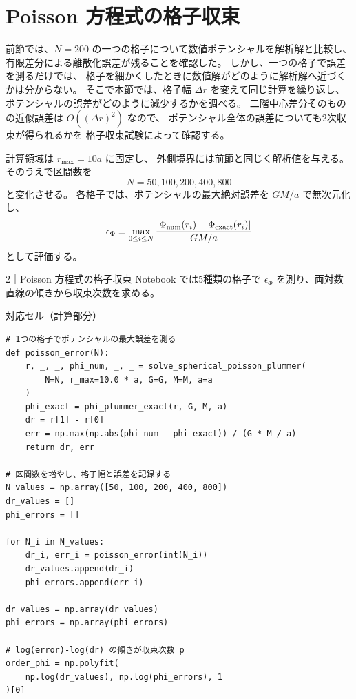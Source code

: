 \section{Poisson 方程式の格子収束}
\label{sec:ch2-poisson-convergence}

前節では、$N=200$ の一つの格子について数値ポテンシャルを解析解と比較し、
有限差分による離散化誤差が残ることを確認した。
しかし、一つの格子で誤差を測るだけでは、
格子を細かくしたときに数値解がどのように解析解へ近づくかは分からない。
そこで本節では、格子幅 $\Delta r$ を変えて同じ計算を繰り返し、
ポテンシャルの誤差がどのように減少するかを調べる。
二階中心差分そのものの近似誤差は $O((\Delta r)^2)$ なので、
ポテンシャル全体の誤差についても2次収束が得られるかを
格子収束試験によって確認する。

計算領域は $r_{\max}=10a$ に固定し、
外側境界には前節と同じく解析値を与える。
そのうえで区間数を
\begin{equation}
 N=50,100,200,400,800
\label{eq:ch2-poisson-grids}
\end{equation}
と変化させる。
各格子では、ポテンシャルの最大絶対誤差を $GM/a$ で無次元化し、
\begin{equation}
 \epsilon_\Phi
 \equiv
 \max_{0\le i\le N}
 \frac{|\Phi_{\rm num}(r_i)-\Phi_{\rm exact}(r_i)|}{GM/a}
\label{eq:ch2-phi-error-def}
\end{equation}
として評価する。

\begin{notebookblock}{2｜Poisson 方程式の格子収束}
Notebook では5種類の格子で $\epsilon_\Phi$ を測り、両対数直線の傾きから収束次数を求める。

{\sffamily\small\color{graytext}対応セル（計算部分）}
\begin{Verbatim}[xleftmargin=2mm,fontsize=\small,frame=single,framesep=1.8mm,framerule=0.35pt,rulecolor=\color{listingframe},fillcolor=\color{listingbg}]
# 1つの格子でポテンシャルの最大誤差を測る
def poisson_error(N):
    r, _, _, phi_num, _, _ = solve_spherical_poisson_plummer(
        N=N, r_max=10.0 * a, G=G, M=M, a=a
    )
    phi_exact = phi_plummer_exact(r, G, M, a)
    dr = r[1] - r[0]
    err = np.max(np.abs(phi_num - phi_exact)) / (G * M / a)
    return dr, err

# 区間数を増やし、格子幅と誤差を記録する
N_values = np.array([50, 100, 200, 400, 800])
dr_values = []
phi_errors = []

for N_i in N_values:
    dr_i, err_i = poisson_error(int(N_i))
    dr_values.append(dr_i)
    phi_errors.append(err_i)

dr_values = np.array(dr_values)
phi_errors = np.array(phi_errors)

# log(error)-log(dr) の傾きが収束次数 p
order_phi = np.polyfit(
    np.log(dr_values), np.log(phi_errors), 1
)[0]
\end{Verbatim}
\end{notebookblock}

